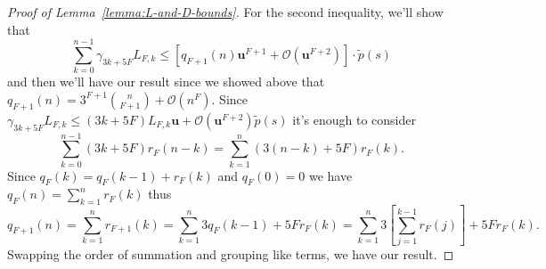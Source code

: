 \documentclass[3p, authoryear, square]{elsarticle}
\theoremstyle{definition}
\newcommand{\bigO}[1]{\mathcal{O}\left(#1\right)}
\newcommand{\mach}{\mathbf{u}}
\begin{document}
\begin{proof}[Proof of Lemma~\ref{lemma:L-and-D-bounds}]
For the second inequality, we'll show that
\begin{equation}
\sum_{k = 0}^{n - 1} \gamma_{3k + 5F} L_{F, k} \leq
  \left[q_{F + 1}(n) \mach^{F + 1} +
  \bigO{\mach^{F + 2}}\right] \cdot \widetilde{p}(s)
\end{equation}
and then we'll have our result since we showed above that
\(q_{F + 1}(n) = 3^{F + 1} \binom{n}{F + 1} + \bigO{n^F}\). Since
\(\gamma_{3k + 5F} L_{F, k} \leq (3k + 5F) L_{F, k} \mach +
\bigO{\mach^{F + 2}} \widetilde{p}(s)\) it's enough to consider
\begin{equation}
\sum_{k = 0}^{n - 1} (3k + 5F) r_F(n - k) =
\sum_{k = 1}^n (3(n - k) + 5F) r_F(k).
\end{equation}
Since \(q_F(k) = q_F(k - 1) + r_F(k)\) and \(q_F(0) = 0\) we have
\(q_{F}(n) = \sum_{k = 1}^n r_{F}(k)\) thus
\begin{equation}
q_{F + 1}(n) = \sum_{k = 1}^n r_{F + 1}(k)
= \sum_{k = 1}^n 3 q_F(k - 1) + 5 F r_F(k)
= \sum_{k = 1}^n 3 \left[\sum_{j = 1}^{k - 1} r_F(j)\right] + 5 F r_F(k).
\end{equation}
Swapping the order of summation and grouping like terms, we have our
result.
\end{proof}
\end{document}
